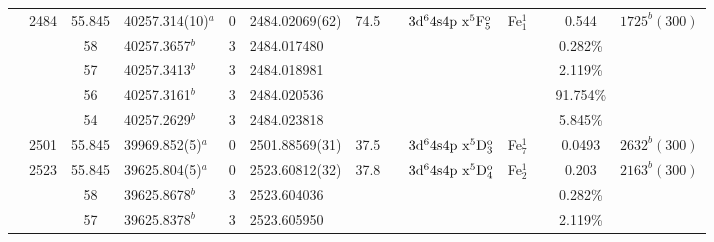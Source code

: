 \begin{table*}
\begin{center}
{\begin{tabular}{:l;l;c;l;c;l;c;l;l;c;c;c;c}
                                  & 2484   & 55.845    & 40257.314(10)$^{a}$              & 0 &    2484.02069(62)  & 74.5 & $                                        $ & $3\rm{d}^64\rm{s}4\rm{p~x}^5\rm{F}_{5}^{\rm o}$ & Fe$^1_{1}$  &              & 0.544     & $ 1725^{b}(300)$\\
\rowstyle{\itshape}               &        & 58        & 40257.3657$^{b}$                 & 3 &   2484.017480      &      & $                                        $ & $                                        $ &             &              & 0.282\%   & $     ^{}     $\\
\rowstyle{\itshape}               &        & 57        & 40257.3413$^{b}$                 & 3 &   2484.018981      &      & $                                        $ & $                                        $ &             &              & 2.119\%   & $     ^{}     $\\
\rowstyle{\itshape}               &        & 56        & 40257.3161$^{b}$                 & 3 &   2484.020536      &      & $                                        $ & $                                        $ &             &              & 91.754\%  & $     ^{}     $\\
\rowstyle{\itshape}               &        & 54        & 40257.2629$^{b}$                 & 3 &   2484.023818      &      & $                                        $ & $                                        $ &             &              & 5.845\%   & $     ^{}     $\\
                                  & 2501   & 55.845    & 39969.852(5)$^{a}$               & 0 &    2501.88569(31)  & 37.5 & $                                        $ & $3\rm{d}^64\rm{s}4\rm{p~x}^5\rm{D}_{3}^{\rm o}$ & Fe$^1_{7}$  &              & 0.0493    & $ 2632^{b}(300)$\\
                                  & 2523   & 55.845    & 39625.804(5)$^{a}$               & 0 &    2523.60812(32)  & 37.8 & $                                        $ & $3\rm{d}^64\rm{s}4\rm{p~x}^5\rm{D}_{4}^{\rm o}$ & Fe$^1_{2}$  &              & 0.203     & $ 2163^{b}(300)$\\
\rowstyle{\itshape}               &        & 58        & 39625.8678$^{b}$                 & 3 &   2523.604036      &      & $                                        $ & $                                        $ &             &              & 0.282\%   & $     ^{}     $\\
\rowstyle{\itshape}               &        & 57        & 39625.8378$^{b}$                 & 3 &   2523.605950      &      & $                                        $ & $                                        $ &             &              & 2.119\%   & $     ^{}     $\\

\end{tabular}}
\end{center}
\end{table*}
